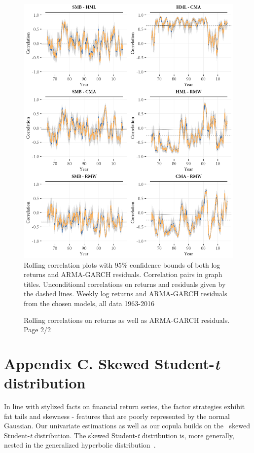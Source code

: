 \begin{figure}[H]
  \caption{Rolling correlations on returns as well as ARMA-GARCH residuals. Page 2/2}
  \label{fig:appendix_rolling2}
  \centering
  \begin{minipage}{\textwidth}
  \includegraphics[scale=1]{graphics/appendix_rolling2.png}  
  \vspace{3mm}
  \footnotesize
  Rolling correlation plots with 95\% confidence bounds of both log returns and ARMA-GARCH residuals. Correlation pairs in graph titles. Unconditional correlations on returns and residuals given by the dashed lines. Weekly log returns and ARMA-GARCH residuals from the chosen models, all data 1963-2016
  \end{minipage}
\end{figure}

\newpage

\section{Appendix C. Skewed Student-\textit{t} distribution} 
\label{app:ghstmv}
In line with stylized facts on financial return series, the factor strategies exhibit fat tails and skewness - features that are poorly represented by the normal Gaussian. Our univariate estimations as well as our copula builds on the~\textcite{Hansen1994} skewed Student-\textit{t} distribution. The skewed Student-\textit{t} distribution is, more generally, nested in the generalized hyperbolic distribution~\autocite{McNeilFreyEmbrecht2005}.

